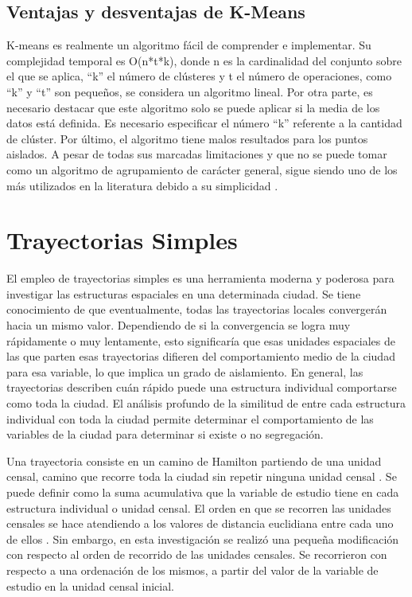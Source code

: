 \subsection{Ventajas y desventajas de K-Means}
K-means es realmente un algoritmo fácil de comprender e implementar. Su complejidad temporal es O(n*t*k), donde n es la cardinalidad del conjunto sobre el que se aplica, “k” el número de clústeres y t el número de operaciones, como “k” y “t” son pequeños, se considera un algoritmo lineal. Por otra parte, es necesario destacar que este algoritmo solo se puede aplicar si la media de los datos está definida. Es necesario especificar el número “k” referente a la cantidad de clúster. Por último, el algoritmo tiene malos resultados para los puntos aislados. A pesar de todas sus marcadas limitaciones y que no se puede tomar como un algoritmo de agrupamiento de carácter general, sigue siendo uno de los más utilizados en la literatura debido a su simplicidad \cite{Morissette2013TheKC}.

\section{Trayectorias Simples}
El empleo de trayectorias simples es una herramienta moderna y poderosa para investigar las estructuras espaciales en una determinada ciudad. Se tiene conocimiento de que eventualmente, todas las trayectorias locales convergerán hacia un mismo valor. Dependiendo de si la convergencia se logra muy rápidamente o muy lentamente, esto significaría que esas unidades espaciales de las que parten esas trayectorias difieren del comportamiento medio de la ciudad para esa variable, lo que implica un grado de aislamiento. En general, las trayectorias describen cuán rápido puede una estructura individual comportarse como toda la ciudad. El análisis profundo de la similitud de entre cada estructura individual con toda la ciudad permite determinar el comportamiento de las variables de la ciudad para determinar si existe o no segregación.

Una trayectoria consiste en un camino de Hamilton partiendo de una unidad censal, camino que recorre toda la ciudad sin repetir ninguna unidad censal \cite{RandonFurling2018FromUS}. Se puede definir como la suma acumulativa que la variable de estudio tiene en cada estructura individual o unidad censal. El orden en que se recorren las unidades censales se hace atendiendo a los valores de distancia euclidiana entre cada uno de ellos \cite{Armas2020AnlisisDS}. Sin embargo, en esta investigación se realizó una pequeña modificación con respecto al orden de recorrido de las unidades censales. Se recorrieron con respecto a una ordenación de los mismos, a partir del valor de la variable de estudio en la unidad censal inicial.

